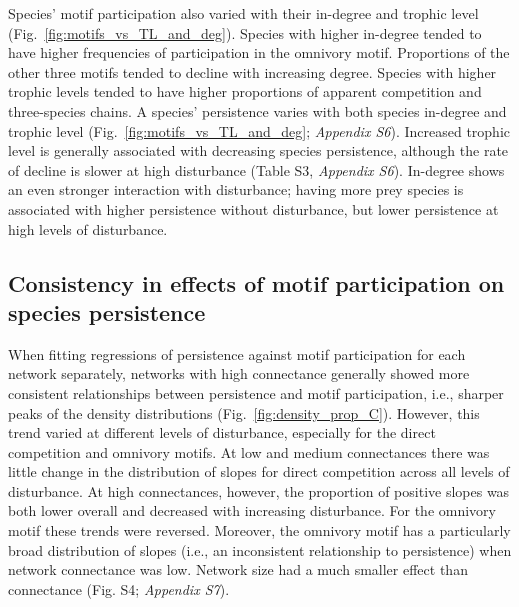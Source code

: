 \documentclass[12pt]{article}
\begin{document}
\begin{spacing}{2.0}
       Species' motif participation also varied with their in-degree and trophic level (Fig.~\ref{fig:motifs_vs_TL_and_deg}).
       Species with higher in-degree tended to have higher frequencies of participation in the omnivory motif. Proportions of the other three motifs tended to decline with increasing degree.
       Species with higher trophic levels tended to have higher proportions of apparent competition and three-species chains. 
       A species' persistence varies with both species in-degree and trophic level (Fig.~\ref{fig:motifs_vs_TL_and_deg}; \emph{Appendix S6}). Increased trophic level is generally associated with decreasing species persistence, although the rate of decline is slower at high disturbance (Table S3, \emph{Appendix S6}).
       In-degree shows an even stronger interaction with disturbance; having more prey species is associated with higher persistence without disturbance, but lower persistence at high levels of disturbance.
        
        
    \subsection*{Consistency in effects of motif participation on species persistence}

        When fitting regressions of persistence against motif participation for each network separately, networks with high connectance generally showed more consistent relationships between persistence and motif participation, i.e., sharper peaks of the density distributions (Fig.~\ref{fig:density_prop_C}).
        However, this trend varied at different levels of disturbance, especially for the direct competition and omnivory motifs.
        At low and medium connectances there was little change in the distribution of slopes for direct competition across all levels of disturbance. 
        At high connectances, however, the proportion of positive slopes was both lower overall and decreased with increasing disturbance. 
        For the omnivory motif these trends were reversed. 
        Moreover, the omnivory motif has a particularly broad distribution of slopes (i.e., an inconsistent relationship to persistence) when network connectance was low. 
        Network size had a much smaller effect than connectance (Fig. S4; \emph{Appendix S7}).



\end{spacing}
\end{document}
